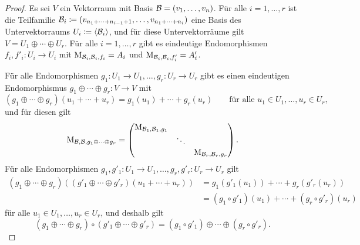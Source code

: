 \documentclass[a4paper,10pt]{scrartcl}
\begin{document}
\begin{proof}
  Es sei $V$ ein Vektorraum mit Basis $\mathcal{B} = (v_1, \dotsc, v_n)$.
  Für alle $i = 1, \dotsc, r$ ist die Teilfamilie $\mathcal{B}_i \coloneqq (v_{n_1 + \dotsb + n_{i-1} + 1}, \dotsc, v_{n_1 + \dotsb + n_i})$ eine Basis des Untervektorraums $U_i \coloneqq \left\langle  \mathcal{B}_i  \right\rangle$, und für diese Untervektorräume gilt $V = U_1 \oplus \dotsb \oplus U_r$.
  Für alle $i = 1, \dotsc, r$ gibt es eindeutige Endomorphismen $f_i, f'_i \colon U_i \to U_i$ mit $\operatorname{M}_{\mathcal{B}_i,  \mathcal{B}_i, f_i} = A_i$ und $\operatorname{M}_{\mathcal{B}_i, \mathcal{B}_i, f'_i} = A'_i$.
  
  Für alle Endomorphismen $g_1 \colon U_1 \to U_1, \dotsc, g_r \colon U_r \to U_r$ gibt es einen eindeutigen Endomorphismus $g_1 \oplus \dotsb \oplus g_r \colon V \to V$ mit
  \[
      (g_1 \oplus \dotsb \oplus g_r)(u_1 + \dotsb + u_r)
    = g_1(u_1) + \dotsb + g_r(u_r)
    \qquad
    \text{für alle $u_1 \in U_1, \dotsc, u_r \in U_r$},
  \]
  und für diesen gilt
  \[
      \operatorname{M}_{\mathcal{B}, \mathcal{B}, g_1 \oplus \dotsb \oplus g_r}
    = \begin{pmatrix}
        \operatorname{M}_{\mathcal{B}_1, \mathcal{B}_1, g_1} &         &
      \\
                                                  & \ddots  &
      \\
                                                  &         & \operatorname{M}_{\mathcal{B}_r, \mathcal{B}_r, g_r}
      \end{pmatrix}.
  \]
  Für alle Endomorphismen $g_1, g'_1 \colon U_1 \to U_1, \dotsc, g_r, g'_r \colon U_r \to U_r$ gilt
  \begin{align*}
        (g_1 \oplus \dotsb \oplus g_r)\left( (g'_1 \oplus \dotsb \oplus g'_r)(u_1 + \dotsb + u_r) \right)
    &=  g_1(g'_1(u_1)) + \dotsb + g_r(g'_r(u_r))
    \\
    &=  (g_1 \circ g'_1)(u_1) + \dotsb + (g_r \circ g'_r)(u_r)
  \end{align*}
  für alle $u_1 \in U_1, \dotsc, u_r \in U_r$, und deshalb gilt
  \[
    (g_1 \oplus \dotsb \oplus g_r) \circ (g'_1 \oplus \dotsb \oplus g'_r)
    = (g_1 \circ g'_1) \oplus \dotsb \oplus (g_r \circ g'_r).
  \]
  

\end{proof}
\end{document}
